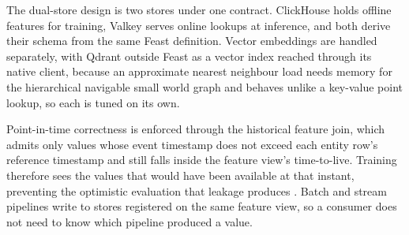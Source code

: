 The dual-store design is two stores under one contract. ClickHouse holds offline features for training, Valkey serves online lookups at inference, and both derive their schema from the same Feast definition. Vector embeddings are handled separately, with Qdrant outside Feast as a vector index reached through its native client, because an approximate nearest neighbour load needs memory for the hierarchical navigable small world graph \cite{malkov2020efficient} and behaves unlike a key-value point lookup, so each is tuned on its own.

Point-in-time correctness is enforced through the historical feature join, which admits only values whose event timestamp does not exceed each entity row's reference timestamp and still falls inside the feature view's time-to-live. Training therefore sees the values that would have been available at that instant, preventing the optimistic evaluation that leakage produces \cite{kaufman2012leakage}. Batch and stream pipelines write to stores registered on the same feature view, so a consumer does not need to know which pipeline produced a value.
